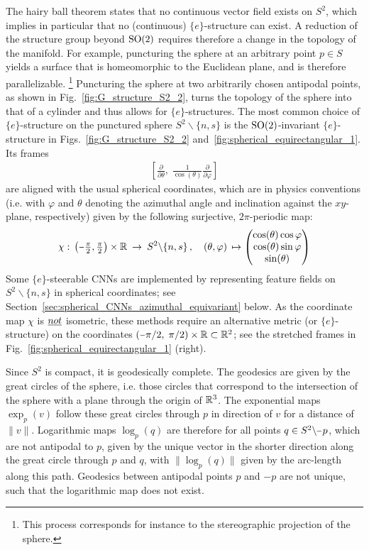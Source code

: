 The hairy ball theorem states that no continuous vector field exists on $S^2$, which implies in particular that no (continuous) $\{e\}$-structure can exist.
A reduction of the structure group beyond $\operatorname{SO}(2)$ requires therefore a change in the topology of the manifold.
For example, puncturing the sphere at an arbitrary point $p\in S$ yields a surface that is homeomorphic to the Euclidean plane, and is therefore parallelizable.%
\footnote{
    This process corresponds for instance to the stereographic projection of the sphere.
}
Puncturing the sphere at two arbitrarily chosen antipodal points, as shown in Fig.~\ref{fig:G_structure_S2_2}, turns the topology of the sphere into that of a cylinder and thus allows for $\{e\}$-structures.
The most common choice of $\{e\}$-structure on the punctured sphere $S^2 \backslash \{n,s\}$ is the $\operatorname{SO}(2)$-invariant $\{e\}$-structure in Figs.~\ref{fig:G_structure_S2_2} and~\ref{fig:spherical_equirectangular_1}.
Its frames
\begin{align}\label{eq:spherical_e_structure_frames}
    \left[ \frac{\partial}{\partial\theta} ,\; \frac{1}{\cos(\theta)} \frac{\partial}{\partial\varphi} \right]
\end{align}
are aligned with the usual spherical coordinates, which are in physics conventions
(i.e. with $\varphi$ and $\theta$ denoting the azimuthal angle and inclination against the $xy$-plane, respectively)
given by the following surjective, $2\pi$-periodic map:
\begin{align}\label{eq:spherical_coords}
    \chi:\, \big( {\textstyle \minus\frac{\pi}{2}, \frac{\pi}{2} }\big) \times \R \:\to\: S^2 \backslash \{n,s\}
    \,, \quad
    (\theta, \varphi) \,\mapsto
    \begin{pmatrix}
        \cos(\theta) \cos{\varphi} \\
        \cos(\theta) \sin{\varphi} \\
        \sin(\theta)
    \end{pmatrix}
\end{align}
Some $\{e\}$-steerable CNNs are implemented by representing feature fields on $S^2 \backslash \{n,s\}$ in spherical coordinates; see Section~\ref{sec:spherical_CNNs_azimuthal_equivariant} below.
As the coordinate map $\chi$ is $\emph{not}$ isometric, these methods require an alternative metric (or $\{e\}$-structure) on the coordinates ${(\minus \pi/2 ,\; \pi/2) \times \R \subset \R^2}$; see the stretched frames in Fig.~\ref{fig:spherical_equirectangular_1} (right).


Since $S^2$ is compact, it is geodesically complete.
The geodesics are given by the great circles of the sphere, i.e. those circles that correspond to the intersection of the sphere with a plane through the origin of $\mathbb{R}^3$.
The exponential maps $\exp_p(v)$ follow these great circles through $p$ in direction of $v$ for a distance of $\lVert v\rVert$.
Logarithmic maps $\log_p(q)$ are therefore for all points $q \in S^2 \backslash \mkern-1mu\minus\mkern1mu p$, which are not antipodal to $p$, given by the unique vector in the shorter direction along the great circle through $p$ and $q$, with $\lVert\log_p(q)\rVert$ given by the arc-length along this path.
Geodesics between antipodal points $p$ and $-p$ are not unique, such that the logarithmic map does not exist.


